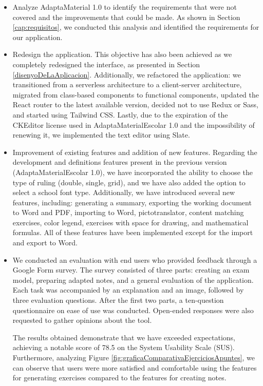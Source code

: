 \begin{itemize}
    \item Analyze AdaptaMaterial 1.0 to identify the requirements that were not covered and the improvements that could be made. As shown in Section \ref{cap:requisitos}, we conducted this analysis and identified the requirements for our application.
    \item Redesign the application. This objective has also been achieved as we completely redesigned the interface, as presented in Section \ref{disenyoDeLaAplicacion}. Additionally, we refactored the application: we transitioned from a serverless architecture to a client-server architecture, migrated from class-based components to functional components, updated the React router to the latest available version, decided not to use Redux or Sass, and started using Tailwind CSS. Lastly, due to the expiration of the CKEditor license used in AdaptaMaterialEscolar 1.0 and the impossibility of renewing it, we implemented the text editor using Slate.
    \item Improvement of existing features and addition of new features. Regarding the development and definitions features present in the previous version (AdaptaMaterialEscolar 1.0), we have incorporated the ability to choose the type of ruling (double, single, grid), and we have also added the option to select a school font type. Additionally, we have introduced several new features, including: generating a summary, exporting the working document to Word and PDF, importing to Word, pictotranslator, content matching exercises, color legend, exercises with space for drawing, and mathematical formulas. All of these features have been implemented except for the import and export to Word.
    \item We conducted an evaluation with end users who provided feedback through a Google Form survey. The survey consisted of three parts: creating an exam model, preparing adapted notes, and a general evaluation of the application. Each task was accompanied by an explanation and an image, followed by three evaluation questions. After the first two parts, a ten-question questionnaire on ease of use was conducted. Open-ended responses were also requested to gather opinions about the tool.

    The results obtained demonstrate that we have exceeded expectations, achieving a notable score of 78.5 on the System Usability Scale (SUS). Furthermore, analyzing Figure \ref{fig:graficaComparativaEjerciciosApuntes}, we can observe that users were more satisfied and comfortable using the features for generating exercises compared to the features for creating notes.
\end{itemize}



